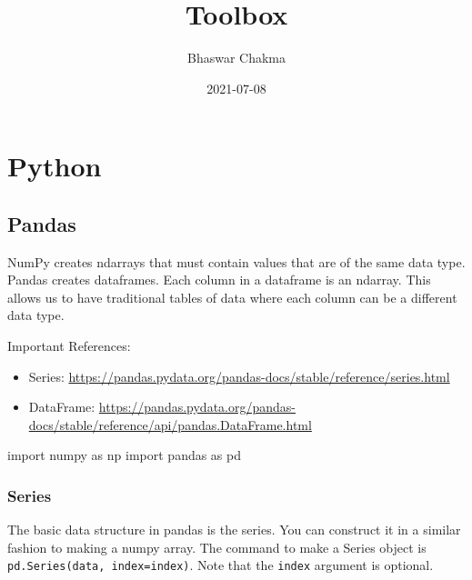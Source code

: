 \documentclass[
]{book}
\title{Toolbox}
\author{Bhaswar Chakma}
\date{2021-07-08}
\newenvironment{Shaded}{\begin{snugshade}}{\end{snugshade}}
\newcommand{\ImportTok}[1]{#1}
\newcommand{\NormalTok}[1]{#1}
\begin{document}
\maketitle

{
\setcounter{tocdepth}{1}
\tableofcontents
}
\hypertarget{section}{%
\chapter*{}\label{section}}

\hypertarget{python}{%
\chapter{Python}\label{python}}

\hypertarget{pandas}{%
\section{Pandas}\label{pandas}}

NumPy creates ndarrays that must contain values that are of the same data type.
Pandas creates dataframes. Each column in a dataframe is an ndarray. This allows us to have
traditional tables of data where each column can be a different data type.

Important References:

\begin{itemize}
\item
  Series: \url{https://pandas.pydata.org/pandas-docs/stable/reference/series.html}
\item
  DataFrame: \url{https://pandas.pydata.org/pandas-docs/stable/reference/api/pandas.DataFrame.html}
\end{itemize}

\begin{Shaded}
\begin{Highlighting}[]
\ImportTok{import}\NormalTok{ numpy }\ImportTok{as}\NormalTok{ np}
\ImportTok{import}\NormalTok{ pandas }\ImportTok{as}\NormalTok{ pd}
\end{Highlighting}
\end{Shaded}

\hypertarget{series}{%
\subsection{Series}\label{series}}

The basic data structure in pandas is the series. You can construct it in a similar fashion to making a numpy array. The command to make a Series object is
\texttt{pd.Series(data,\ index=index)}. Note that the \texttt{index} argument is optional.
\end{document}

